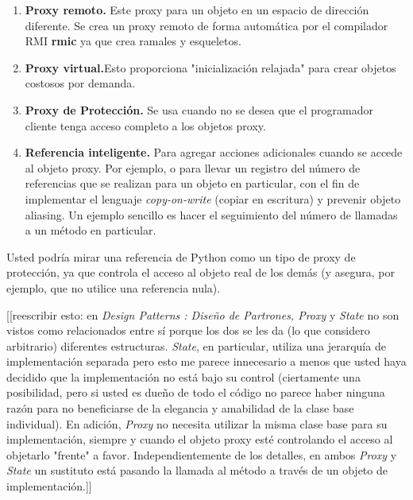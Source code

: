 \begin{enumerate}[1.]
    \item \textbf{Proxy remoto.} Este proxy para un objeto en un espacio de dirección diferente. Se crea un proxy remoto de forma automática por el compilador RMI \textbf{rmic} ya que crea ramales y esqueletos.
    
    \item \textbf{Proxy virtual.}Esto proporciona "inicialización relajada" para crear objetos costosos por demanda.
    
    \item \textbf{Proxy de Protección.} Se usa cuando no se desea que el programador cliente tenga acceso completo a los objetos proxy.
    
    \item \textbf{Referencia inteligente.} Para agregar acciones adicionales cuando se accede al objeto proxy. Por ejemplo, o para llevar un registro del número de referencias que se realizan para un objeto en particular, con el fin de implementar el lenguaje \textit{copy-on-write} (copiar en escritura) y prevenir objeto aliasing.
    Un ejemplo sencillo es hacer el seguimiento del número de llamadas a un método en particular.
\end{enumerate}

Usted podría mirar una referencia de Python como un tipo de proxy de protección, ya que controla el acceso al objeto real de los demás (y asegura, por ejemplo, que no utilice una referencia nula). \newline

[[reescribir esto: en \textit{Design Patterns : Diseño de Partrones, Proxy} y \textit{State} no son vistos como relacionados entre sí porque los dos se les da (lo que considero arbitrario) diferentes estructuras.
\textit{State}, en particular, utiliza una jerarquía de implementación separada pero esto me parece innecesario a menos que usted haya decidido que la implementación no está bajo su control (ciertamente una posibilidad, pero si usted es dueño de todo el código no parece haber ninguna razón para no beneficiarse de la elegancia y amabilidad de la clase base individual). En adición, \textit{Proxy} no necesita utilizar la misma clase base para su implementación, siempre y cuando el objeto proxy esté controlando el acceso al objetarlo "frente" a favor. %
Independientemente de los detalles, en ambos \textit{Proxy} y \textit{State} un sustituto está pasando la llamada al método a través de un objeto de implementación.]]

